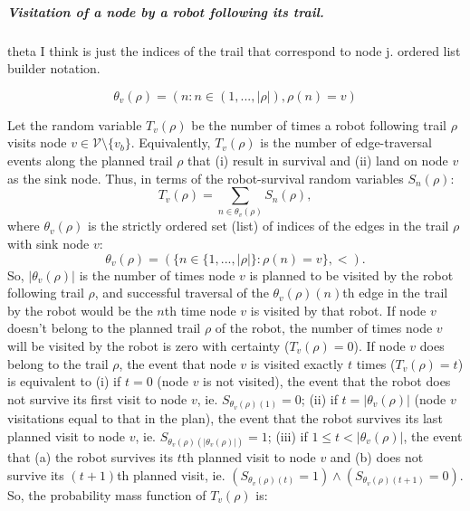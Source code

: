 \documentclass[11pt, oneside]{article}
\begin{document}
\subparagraph{Visitation of a node by a robot following its trail.} 
{\color{red} theta I think is just the indices of the trail that correspond to node j. ordered list builder notation.}

\begin{equation}
	\theta_v(\rho) = (n : n \in (1, ..., \lvert \rho \rvert) ,  \rho(n) = v)
\end{equation}

Let the random variable $T_v(\rho)$ be the number of times a robot following trail $\rho$ visits node $v\in \mathcal{V} \setminus \{v_b\}$. 
Equivalently, $T_v(\rho)$ is the number of edge-traversal events along the planned trail $\rho$ that (i) result in survival and (ii) land on node $v$ as the sink node. 
Thus, in terms of the robot-survival random variables $S_n(\rho)$:
\begin{equation}
	T_v(\rho) = \sum_{n \in \theta_v(\rho) } S_n(\rho), %
\end{equation}
where $\theta_v(\rho)$ is the strictly ordered set (list) of indices of the edges in the trail $\rho$ with sink node $v$:
\begin{equation}
	\theta_v(\rho) = (\{ n \in \{1, ..., \lvert \rho \rvert\} : \rho(n) = v\}, <).
\end{equation} So, $\lvert \theta_v(\rho) \rvert$ is the number of times node $v$ is planned to be visited by the robot following trail $\rho$, and successful traversal of the $\theta_v(\rho)(n)$th edge in the trail by the robot would be the $n$th time node $v$ is visited by that robot.
If node $v$ doesn't belong to the planned trail $\rho$ of the robot, the number of times node $v$ will be visited by the robot is zero with certainty ($T_v(\rho)=0$).
If node $v$ does belong to the trail $\rho$, the event that node $v$ is visited exactly $t$ times ($T_v(\rho)=t$) is equivalent to
(i) if $t=0$ (node $v$ is not visited), the event that the robot does not survive its first visit to node $v$, ie. $S_{\theta_v(\rho)(1)}=0$;
(ii) if $t=\lvert \theta_v(\rho)\rvert$ (node $v$ visitations equal to that in the plan), the event that the robot survives its last planned visit to node $v$, ie. $S_{\theta_v(\rho)(\lvert \theta_v(\rho) \rvert)}=1$;
(iii) if $1 \leq t < \lvert \theta_v(\rho ) \rvert$, the event that (a) the robot survives its $t$th planned visit to node $v$ and (b) does not survive its $(t+1)$th planned visit, ie. $(S_{\theta_v(\rho)(t)}=1) \land (S_{\theta_v(\rho)(t+1)}=0)$. So, the probability mass function of $T_v(\rho)$ is:
\end{document}
